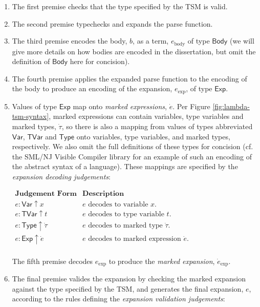 \begin{enumerate}
\item The first premise checks that the type specified by the TSM is valid.
\item The second premise typechecks and expands the parse function.
\item The third premise encodes the body, $b$, as a term, $e_\text{body}$ of type $\mathsf{Body}$ (we will give more details on how bodies are encoded in the dissertation, but omit the definition of $\mathsf{Body}$ here for concision).
\item The fourth premise applies the expanded parse function to the encoding of the body to produce an encoding of the expansion, $e_\text{exp}$, of  type $\mathsf{Exp}$. 
\item Values of type $\mathsf{Exp}$ map onto \emph{marked expressions}, $\dot{e}$. Per Figure \ref{fig:lambda-tsm-syntax}, marked expressions can contain variables, type variables and marked types, $\dot{\tau}$, so there is also a mapping from values of types abbreviated $\mathsf{Var}$, $\mathsf{TVar}$ and $\mathsf{Type}$ onto variables, type variables, and {marked types}, respectively. We also omit the full definitions of these types for concision (cf. the SML/NJ Visible Compiler library \cite{SML/VisibleCompiler} for an example of such an encoding of the abstract syntax of a language). These mappings are specified by the \emph{expansion decoding judgements}:

$\begin{array}{ll}
\textbf{Judgement Form} & \textbf{Description}\\
e : \mathsf{Var} \uparrow x & \text{$e$ decodes to variable $x$.}\\
e : \mathsf{TVar} \uparrow t & \text{$e$ decodes to type variable $t$.}\\
e : \mathsf{Type} \uparrow \dot{\tau} & \text{$e$ decodes to marked type $\dot{\tau}$.}\\
e : \mathsf{Exp} \uparrow \dot{e} & \text{$e$ decodes to marked expression $\dot{e}$.}\\
\end{array}$

The fifth premise decodes $e_\text{exp}$ to produce the \emph{marked expansion}, $\dot{e}_\text{exp}$. 
\item The final premise valides the expansion by checking the marked expansion against the type specified by the TSM, and generates the final expansion, $e$, according to the rules defining the \emph{expansion validation judgements}:


\end{enumerate}
